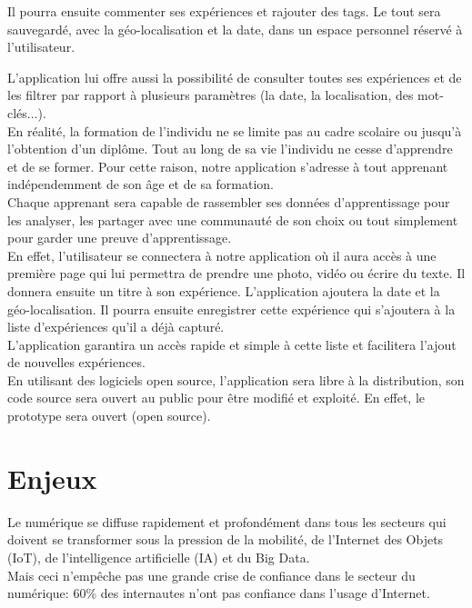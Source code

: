 \documentclass{report}
\begin{document}
Il pourra ensuite commenter ses expériences et rajouter des tags. Le tout sera sauvegardé, avec la géo-localisation et la date, dans un espace personnel réservé à l'utilisateur.

L'application lui offre aussi la possibilité de consulter toutes ses expériences et de les filtrer par rapport à plusieurs paramètres (la date, la localisation, des mot-clés...).
\\

En réalité, la formation de l'individu ne se limite pas au cadre scolaire ou jusqu'à l'obtention d'un diplôme. Tout au long de sa vie l'individu ne cesse d'apprendre et de se former. Pour cette raison, notre application s'adresse à tout apprenant indépendemment de son âge et de sa formation. 
\\

Chaque apprenant sera capable de rassembler ses données d'apprentissage pour les analyser, les partager avec une communauté de son choix ou tout simplement pour garder une preuve d'apprentissage.
\\ 

En effet, l'utilisateur se connectera à notre application où il aura accès à une première page qui lui permettra de prendre une photo, vidéo ou écrire du texte. Il donnera ensuite un titre à son expérience. L'application ajoutera la date et la géo-localisation. Il pourra ensuite enregistrer cette expérience qui s'ajoutera à la liste d'expériences qu'il a déjà capturé.
\\

L'application garantira un accès rapide et simple à cette liste et facilitera l'ajout de nouvelles expériences.
\\
En utilisant des logiciels open source, l'application sera libre à la distribution, son code source sera ouvert au public pour être modifié et exploité. En effet, le prototype sera ouvert (open source).


\section{Enjeux}
Le numérique se diffuse rapidement et profondément dans tous les secteurs qui doivent se transformer sous la pression de la mobilité, de l'Internet des Objets (IoT), de l'intelligence artificielle (IA) et du Big Data.
\\

Mais ceci n'empêche pas une grande \og crise de confiance \fg   dans le secteur du numérique: 60\% des internautes n'ont pas confiance dans l'usage d'Internet. \cite{ref2}
\\
\end{document}
